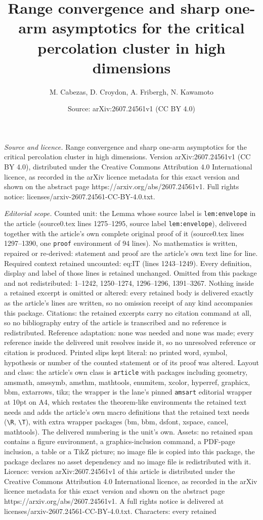 \documentclass[10pt,a4paper]{amsart}
\title[Range convergence and sharp one-arm asymptotics for the crit]{Range convergence and sharp one-arm asymptotics for the critical percolation cluster in high dimensions}
\author{M. Cabezas, D. Croydon, A. Fribergh, N. Kawamoto}
\date{Source: arXiv:2607.24561v1 (CC BY 4.0)}
\begin{document}
\maketitle

\noindent\emph{Source and licence.} Range convergence and sharp one-arm asymptotics for the critical percolation cluster in high dimensions. Version arXiv:2607.24561v1 (CC BY 4.0), distributed under the Creative Commons Attribution 4.0 International licence, as recorded in the arXiv licence metadata for this exact version and shown on the abstract page https://arxiv.org/abs/2607.24561v1. Full rights notice: licenses/arxiv-2607.24561-CC-BY-4.0.txt.\par\smallskip

\noindent\textit{Editorial scope.} Counted unit: the Lemma whose source label is \texttt{lem:envelope} in the article (source0.tex lines 1275--1295, source label \texttt{lem:envelope}), delivered together with the article's own complete original proof of it (source0.tex lines 1297--1390, one \texttt{proof} environment of 94 lines). No mathematics is written, repaired or re-derived: statement and proof are the article's own text line for line. Required context retained uncounted: eq:IT (lines 1243--1249). Every definition, display and label of those lines is retained unchanged. Omitted from this package and not redistributed: 1--1242, 1250--1274, 1296--1296, 1391--3267. Nothing inside a retained excerpt is omitted or altered: every retained body is delivered exactly as the article's lines are written, so no omission receipt of any kind accompanies this package. Citations: the retained excerpts carry no citation command at all, so no bibliography entry of the article is transcribed and no reference is redistributed. Reference adaptation: none was needed and none was made; every reference inside the delivered unit resolves inside it, so no unresolved reference or citation is produced. Printed slips kept literal: no printed word, symbol, hypothesis or number of the counted statement or of its proof was altered. Layout and class: the article's own class is \texttt{article} with packages including geometry, amsmath, amssymb, amsthm, mathtools, enumitem, xcolor, hyperref, graphicx, bbm, extarrows, tikz; the wrapper is the lane's pinned \texttt{amsart} editorial wrapper at 10pt on A4, which restates the theorem-like environments the retained text needs and adds the article's own macro definitions that the retained text needs (\texttt{\textbackslash R}, \texttt{\textbackslash T}), with extra wrapper packages (bm, bbm, dsfont, xspace, cancel, mathtools). The delivered numbering is the unit's own. Assets: no retained span contains a figure environment, a graphics-inclusion command, a PDF-page inclusion, a table or a TikZ picture; no image file is copied into this package, the package declares no asset dependency and no image file is redistributed with it. Licence: version arXiv:2607.24561v1 of this article is distributed under the Creative Commons Attribution 4.0 International licence, as recorded in the arXiv licence metadata for this exact version and shown on the abstract page https://arxiv.org/abs/2607.24561v1. A full rights notice is delivered at licenses/arxiv-2607.24561-CC-BY-4.0.txt. Characters: every retained 
\end{document}
